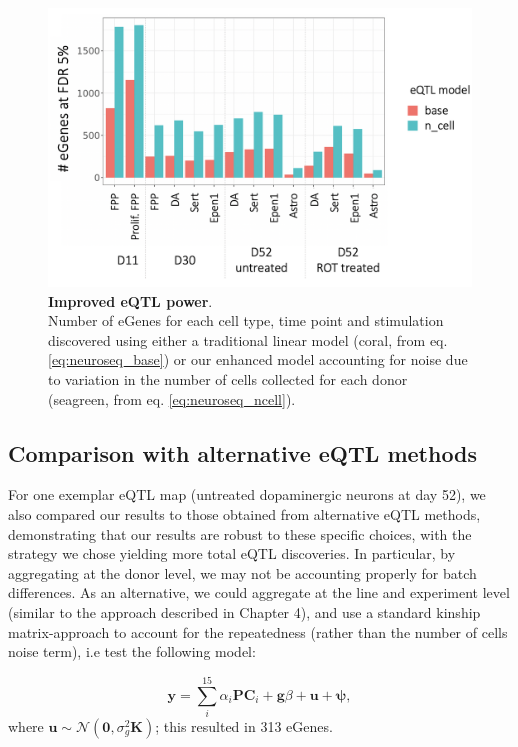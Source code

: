 \begin{figure}[h]
\centering
\includegraphics[width=13cm]{Chapter5/Fig/neuroseq_eqtl_power.png}
\caption[Improved eQTL power]{\textbf{Improved eQTL power}.\\
Number of eGenes for each cell type, time point and stimulation discovered using either a traditional linear model (coral, from eq. \eqref{eq:neuroseq_base}) or our enhanced model accounting for noise due to variation in the number of cells collected for each donor (seagreen, from eq. \eqref{eq:neuroseq_ncell}).}
\label{fig:neuroseq_eqtl_improved_power}
\end{figure}


\subsection{Comparison with alternative eQTL methods}

For one exemplar eQTL map (untreated dopaminergic neurons at day 52), we also compared our results to those obtained from alternative eQTL methods, demonstrating that our results are robust to these specific choices, with the strategy we chose yielding more total eQTL discoveries. 
In particular, by aggregating at the donor level, we may not be accounting properly for batch differences.
As an alternative, we could aggregate at the line and experiment level (similar to the approach described in Chapter 4), and use a standard kinship matrix-approach to account for the repeatedness (rather than the number of cells noise term), i.e test the following model:

\begin{equation}\label{eq:neuroseq_pcs_kinship}
    \mathbf{y} = \sum_i^{15}\alpha_i \mathbf{PC}_i + \mathbf{g}\beta + \mathbf{u} + \boldsymbol{\psi}, 
\end{equation}
where $ \mathbf{u} \sim \mathcal{N}(\mathbf{0},\sigma_g^2\mathbf{K})$;
this resulted in 313 eGenes.\\

